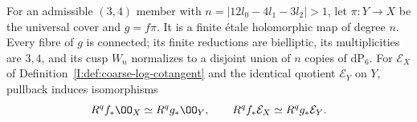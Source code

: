 \begin{proposition}\hypertarget{tag-01S7}{}\label{inv:B3.1}

For an admissible $(3,4)$ member with
$n=|12l_0-4l_1-3l_2|>1$, let $\pi:Y\to X$ be the universal
cover and $g=f\pi$. It is a finite \'etale holomorphic map of degree $n$.
Every fibre of $g$ is connected; its finite reductions are bielliptic,
its multiplicities are $3,4$, and its cusp $W_n$ normalizes to a
disjoint union of $n$ copies of $\mathrm{dP}_6$.
For $\mathcal E_X$ of Definition~\ref{I:def:coarse-log-cotangent}
and the identical quotient $\mathcal E_Y$ on $Y$, pullback induces isomorphisms
\[
R^qf_*\OO_X\simeq R^qg_*\OO_Y,\qquad
R^qf_*\mathcal E_X\simeq R^qg_*\mathcal E_Y.
\]
\end{proposition}


